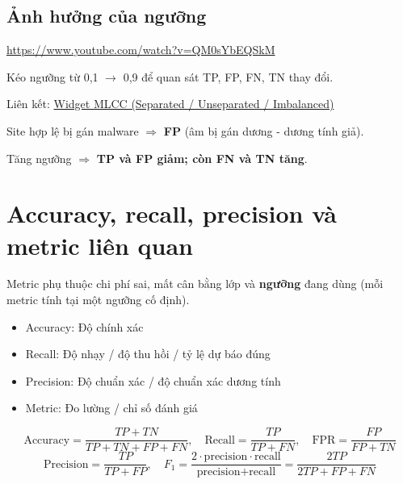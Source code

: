 \documentclass[12pt,a4paper]{article}
\begin{document}
\subsection{Ảnh hưởng của ngưỡng}

\begin{ungdung}[title={Video ngưỡng}]
\url{https://www.youtube.com/watch?v=QM0sYbEQSkM}
\end{ungdung}

\begin{luuy}[title={Widget MLCC (Separated / Unseparated / Imbalanced)}]
Kéo ngưỡng từ 0,1 $\rightarrow$ 0,9 để quan sát TP, FP, FN, TN thay đổi.

Liên kết: \href{https://developers.google.com/machine-learning/crash-course/classification/thresholding}{Widget MLCC (Separated / Unseparated / Imbalanced)}
\end{luuy}

\begin{luuy}[title={Ngưỡng}]
Site hợp lệ bị gán malware $\Rightarrow$ \textbf{FP} (âm bị gán dương - dương tính giả).

Tăng ngưỡng $\Rightarrow$ \textbf{TP và FP giảm; còn FN và TN tăng}.
\end{luuy}

\newpage

\section{Accuracy, recall, precision và metric liên quan}

\begin{dongco}[title={Một con số không đủ}]
Metric phụ thuộc chi phí sai, mất cân bằng lớp và \textbf{ngưỡng} đang dùng (mỗi metric tính tại một ngưỡng cố định).
\begin{itemize}
    \item Accuracy: Độ chính xác
    \item Recall: Độ nhạy / độ thu hồi / tỷ lệ dự báo đúng
    \item Precision: Độ chuẩn xác / độ chuẩn xác dương tính
    \item Metric: Đo lường / chỉ số đánh giá
  \end{itemize}
\end{dongco}

\begin{congthuc}[title={Các công thức chính}]
\[
  \text{Accuracy}=\frac{TP+TN}{TP+TN+FP+FN},\quad
  \text{Recall}=\frac{TP}{TP+FN},\quad
  \text{FPR}=\frac{FP}{FP+TN}
\]
\[
  \text{Precision}=\frac{TP}{TP+FP},\quad
  F_1=\frac{2\cdot\text{precision}\cdot\text{recall}}{\text{precision}+\text{recall}}=\frac{2TP}{2TP+FP+FN}
\]
\end{congthuc}
\end{document}
